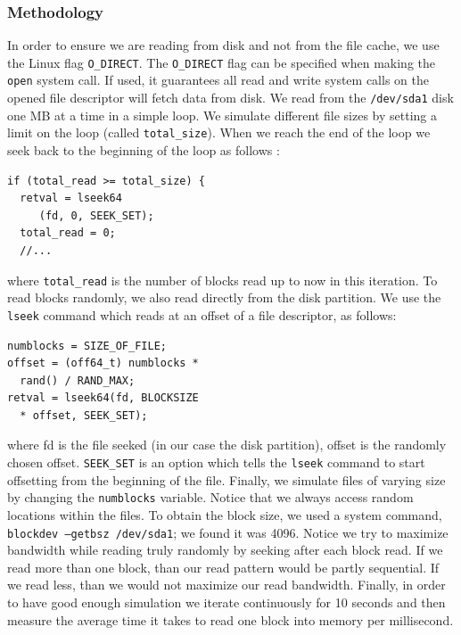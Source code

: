 \subsubsection{Methodology}

In order to ensure we are reading from disk and not from the file cache, we use the Linux flag \texttt{O\_DIRECT}. The \texttt{O\_DIRECT} flag can be specified when making the \texttt{open} system call. If used, it guarantees all read and write system calls on the opened file descriptor will fetch data from disk. We read from the \texttt{/dev/sda1} disk one MB at a time in a simple loop. We simulate different file sizes by setting a limit on the loop (called \texttt{total\_size}). When we reach the end of the loop we seek back to the beginning of the loop as follows : 

\begin{lstlisting}
if (total_read >= total_size) {
  retval = lseek64
     (fd, 0, SEEK_SET);
  total_read = 0;
  //...
\end{lstlisting}

where \texttt{total\_read} is the number of blocks read up to now in this iteration. To read blocks randomly, we also read directly from the disk partition. We use the \texttt{lseek} command which reads at an offset of a file descriptor, as follows:

\begin{lstlisting}
numblocks = SIZE_OF_FILE;
offset = (off64_t) numblocks *
  rand() / RAND_MAX;
retval = lseek64(fd, BLOCKSIZE 
  * offset, SEEK_SET);
\end{lstlisting}

where fd is the file seeked (in our case the disk partition), offset is the randomly chosen offset. \texttt{SEEK\_SET} is an option which tells the \texttt{lseek} command to start offsetting from the beginning of the file. Finally, we simulate files of varying size by changing the \texttt{numblocks} variable. Notice that we always access random locations within the files. To obtain the block size, we used a system command, \texttt{blockdev --getbsz /dev/sda1}; we found it was 4096. Notice we try to maximize bandwidth while reading truly randomly by seeking after each block read. If we read more than one block, than our read pattern would be partly sequential. If we read less, than we would not maximize our read bandwidth. Finally, in order to have good enough simulation we iterate continuously for 10 seconds and then measure the average time it takes to read one block into memory per millisecond.

